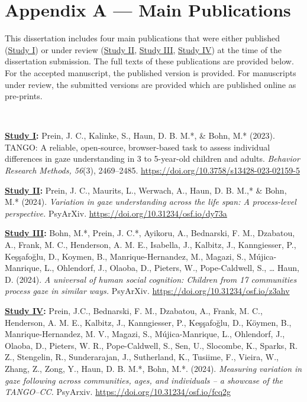 \documentclass[
]{scrbook}
\begin{document}
\chapter{Appendix A --- Main Publications}\label{appendixA}

This dissertation includes four main publications that were either published (\hyperref[studyI]{Study I}) or under review (\hyperref[studyII]{Study II}, \hyperref[studyIII]{Study III}, \hyperref[studyIV]{Study IV}) at the time of the dissertation submission. The full texts of these publications are provided below. For the accepted manuscript, the published version is provided. For manuscripts under review, the submitted versions are provided which are published online as pre-prints.

~

\textbf{\hyperref[studyI]{Study I}:} Prein, J. C., Kalinke, S., Haun, D. B. M.*, \& Bohn, M.* (2023). TANGO: A reliable, open-source, browser-based task to assess individual differences in gaze understanding in 3 to 5-year-old children and adults. \emph{Behavior Research Methods, 56}(3), 2469--2485. \mbox{\url{https://doi.org/10.3758/s13428-023-02159-5}}

\textbf{\hyperref[studyII]{Study II}:} Prein, J. C., Maurits, L., Werwach, A., Haun, D. B. M.,* \& Bohn, M.* (2024). \emph{Variation in gaze understanding across the life span: A process-level perspective.} PsyArXiv. \mbox{\url{https://doi.org/10.31234/osf.io/dy73a}}

\textbf{\hyperref[studyIII]{Study III}:} Bohn, M.*, Prein, J. C.*, Ayikoru, A., Bednarski, F. M., Dzabatou, A., Frank, M. C., Henderson, A. M. E., Isabella, J., Kalbitz, J., Kanngiesser, P., Keşşafoğlu, D., Koymen, B., Manrique-Hernandez, M., Magazi, S., Mújica-Manrique, L., Ohlendorf, J., Olaoba, D., Pieters, W., Pope-Caldwell, S., \ldots{} Haun, D. (2024). \emph{A universal of human social cognition: Children from 17 communities process gaze in similar ways.} PsyArXiv. \mbox{\url{https://doi.org/10.31234/osf.io/z3ahv}}

\textbf{\hyperref[studyIV]{Study IV}:} Prein, J.C., Bednarski, F. M., Dzabatou, A., Frank, M. C., Henderson, A. M. E., Kalbitz, J., Kanngiesser, P., Keşşafoğlu, D., Köymen, B., Manrique-Hernandez, M. V., Magazi, S., Mújica-Manrique, L., Ohlendorf, J., Olaoba, D., Pieters, W. R., Pope-Caldwell, S., Sen, U., Slocombe, K., Sparks, R. Z., Stengelin, R., Sunderarajan, J., Sutherland, K., Tusiime, F., Vieira, W., Zhang, Z., Zong, Y., Haun, D. B. M.*, Bohn, M.*. (2024). \emph{Measuring variation in gaze following across communities, ages, and individuals -- a showcase of the TANGO--CC.} PsyArxiv. \mbox{\url{https://doi.org/10.31234/osf.io/fcq2g}}
\end{document}
